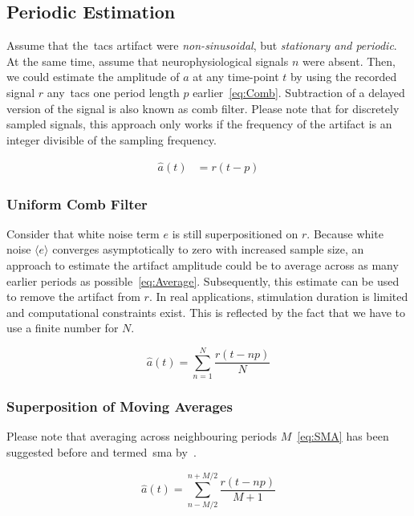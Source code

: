 \documentclass[a4paper]{article}
\begin{document}
\subsection{Periodic Estimation}
Assume that the~\gls{tacs} artifact were \emph{non-sinusoidal}, but \emph{stationary and periodic}. At the same time, assume that neurophysiological signals $n$ were absent. Then, we could estimate the amplitude of $a$ at any time-point $t$ by using the recorded signal $r$ any~\gls{tacs} one period length $p$ earlier~\eqref{eq:Comb}.
Subtraction of a delayed version of the signal is also known as comb filter. Please note that for discretely sampled signals, this approach only works if the frequency of the artifact is an integer divisible of the sampling frequency.

\begin{align}
    \hat{a}(t) & = r(t-p)\label{eq:Comb}
\end{align}

\subsubsection{Uniform Comb Filter}

Consider that white noise term $e$ is still superpositioned on $r$.  Because white noise $\langle e\rangle$ converges asymptotically to zero with increased sample size, an approach to estimate the artifact amplitude could be to average across as many earlier periods as possible~\eqref{eq:Average}. Subsequently, this estimate can be used to  remove the artifact from $r$.
In real applications, stimulation duration is limited and computational constraints exist. This is reflected by the fact that we have to use a finite number for $N$.

\begin{equation}
    \hat{a}(t) = \sum_{n=1}^{N} \frac{r(t - np)}{N}\label{eq:Average}
\end{equation}

\subsubsection{Superposition of Moving Averages}

Please note that averaging across neighbouring periods $M$~\eqref{eq:SMA} has been suggested before and termed~\gls{sma} by~\cite{Kohli_2015}.

\begin{equation}
    \hat{a}(t) = \sum_{n-M/2}^{n+M/2} \frac{r(t - np)}{M+1}\label{eq:SMA}
\end{equation}
\end{document}

